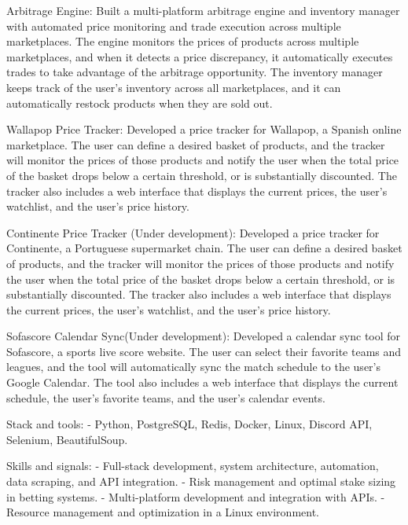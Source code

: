 \begin{cventries}
{        Arbitrage Engine:
          Built a multi-platform arbitrage engine and inventory manager with automated price monitoring and trade execution across multiple marketplaces.
          The engine monitors the prices of products across multiple marketplaces, and when it detects a price discrepancy, it automatically executes trades to take advantage of the arbitrage opportunity.
          The inventory manager keeps track of the user's inventory across all marketplaces, and it can automatically restock products when they are sold out.

        Wallapop Price Tracker:
          Developed a price tracker for Wallapop, a Spanish online marketplace.
          The user can define a desired basket of products, and the tracker will monitor the prices of those products and notify the user when the total price of the basket drops below a certain threshold, or is substantially discounted.
          The tracker also includes a web interface that displays the current prices, the user's watchlist, and the user's price history.

        Continente Price Tracker (Under development):
          Developed a price tracker for Continente, a Portuguese supermarket chain.
          The user can define a desired basket of products, and the tracker will monitor the prices of those products and notify the user when the total price of the basket drops below a certain threshold, or is substantially discounted.
          The tracker also includes a web interface that displays the current prices, the user's watchlist, and the user's price history.

        Sofascore Calendar Sync(Under development):
          Developed a calendar sync tool for Sofascore, a sports live score website.
          The user can select their favorite teams and leagues, and the tool will automatically sync the match schedule to the user's Google Calendar.
          The tool also includes a web interface that displays the current schedule, the user's favorite teams, and the user's calendar events.

    Stack and tools:
    - Python, PostgreSQL, Redis, Docker, Linux, Discord API, Selenium, BeautifulSoup.

    Skills and signals:
    - Full-stack development, system architecture, automation, data scraping, and API integration.
    - Risk management and optimal stake sizing in betting systems.
    - Multi-platform development and integration with APIs.
    - Resource management and optimization in a Linux environment.


}
\end{cventries}
